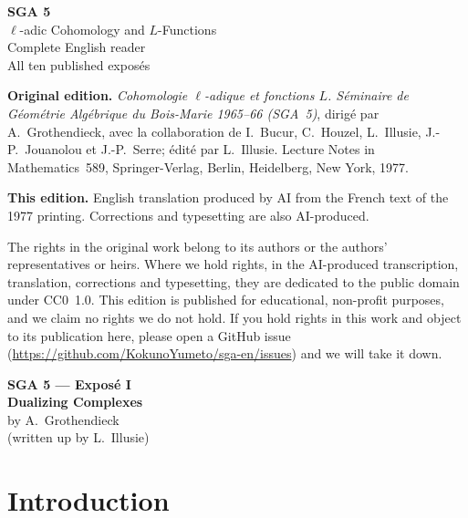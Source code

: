 \documentclass[11pt]{article}
\begin{document}
\begin{titlepage}
\centering
\vspace*{2.1in}
{\LARGE\textbf{SGA 5}}\\[0.6em]
{\Large $\ell$-adic Cohomology and $L$-Functions}\\[1.5em]
{\large Complete English reader}\\[1.2em]
{\normalsize All ten published exposés}
\vfill
\end{titlepage}
\clearpage
\thispagestyle{empty}
\null\vfill
\begingroup\small
\noindent\textbf{Original edition.} \textit{Cohomologie $\ell$-adique et fonctions $L$. S\'eminaire de G\'eom\'etrie Alg\'ebrique du Bois-Marie 1965--66 (SGA~5)}, dirig\'e par A.~Grothendieck, avec la collaboration de I.~Bucur, C.~Houzel, L.~Illusie, J.-P.~Jouanolou et J.-P.~Serre; \'edit\'e par L.~Illusie. Lecture Notes in Mathematics~589, Springer-Verlag, Berlin, Heidelberg, New York, 1977.\par
\medskip
\noindent\textbf{This edition.} English translation produced by AI from the French text of the 1977 printing. Corrections and typesetting are also AI-produced.\par
\medskip
\noindent The rights in the original work belong to its authors or the authors' representatives or heirs. Where we hold rights, in the AI-produced transcription, translation, corrections and typesetting, they are dedicated to the public domain under CC0~1.0. This edition is published for educational, non-profit purposes, and we claim no rights we do not hold. If you hold rights in this work and object to its publication here, please open a GitHub issue (\url{https://github.com/KokunoYumeto/sga-en/issues}) and we will take it down.\par
\endgroup
\clearpage
\tableofcontents
\clearpage

\begin{center}
{\Large \textbf{SGA 5 --- Exposé I}}\\[0.4em]
{\large \textbf{Dualizing Complexes}}\\[0.3em]
by A.~Grothendieck\\
(written up by L.~Illusie)
\end{center}

\section*{Introduction}
\end{document}
